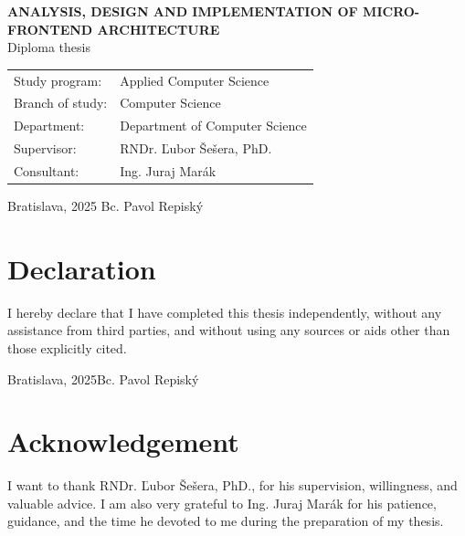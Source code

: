 \documentclass[12pt, oneside]{book}  %
\def\mfrok{2025}
\def\mftitle{Analysis, Design and Implementation of Micro-frontend Architecture}
\def\mfauthor{Bc. Pavol Repiský}
\def\mfskolitel{RNDr. Ľubor Šešera, PhD.}
\def\mfkonzultant{Ing. Juraj Marák}
\def\mfmiestocas{Bratislava, \mfrok}
\def\mftypprace{Diploma thesis}
\def\mfodbor{Computer Science}
\def\program{Applied Computer Science}
\def\mfpracovisko{Department of Computer Science}
\begin{document}
\begin{center}
	\textbf{\MakeUppercase{\Large\mftitle}}\\
	\mftypprace
\end{center}
\vfill


\begin{tabular}{l l}
Study program: & \program \\
Branch of study: & \mfodbor \\
Department: & \mfpracovisko \\
Supervisor: & \mfskolitel \\
Consultant: & \mfkonzultant \\
\end{tabular}

\vfill
\noindent
\mfmiestocas \hfill
\mfauthor
\cleardoublepage




\newpage
\setcounter{page}{2}




\newpage
\thispagestyle{empty}
\chapter*{Declaration}\label{chap:declaration}
I hereby declare that I have completed this thesis independently, without any assistance from third parties, and without using any sources or aids other than those explicitly cited.

\vfill

\hfill \makebox[5cm]{\dotfill} \newline
Bratislava, \mfrok \hfill \mfauthor \hspace{0.8cm}

\newpage
\thispagestyle{empty}
\chapter*{Acknowledgement}\label{chap:thank_you}
I want to thank RNDr. Ľubor Šešera, PhD., for his supervision, willingness, and valuable advice. I am also very grateful to Ing. Juraj Marák for his patience, guidance, and the time he devoted to me during the preparation of my thesis.
\end{document}
